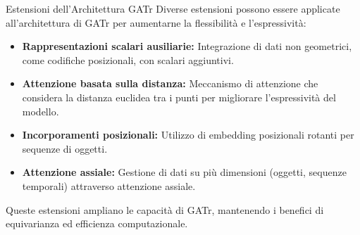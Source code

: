 \begin{frame}{Estensioni dell'Architettura GATr}
    Diverse estensioni possono essere applicate all'architettura di GATr per aumentarne 
    la flessibilità e l'espressività:
    
    \begin{itemize}
        \item \textbf{Rappresentazioni scalari ausiliarie:}  
        Integrazione di dati non geometrici, come codifiche posizionali, con scalari 
        aggiuntivi.
        
        \item \textbf{Attenzione basata sulla distanza:}  
        Meccanismo di attenzione che considera la distanza euclidea tra i punti per 
        migliorare l'espressività del modello.
        
        \item \textbf{Incorporamenti posizionali:}  
        Utilizzo di embedding posizionali rotanti per sequenze di oggetti.
        
        \item \textbf{Attenzione assiale:}  
        Gestione di dati su più dimensioni (oggetti, sequenze temporali) attraverso 
        attenzione assiale.
    \end{itemize}
    
    Queste estensioni ampliano le capacità di GATr, mantenendo i benefici di 
    equivarianza ed efficienza computazionale.
\end{frame}



